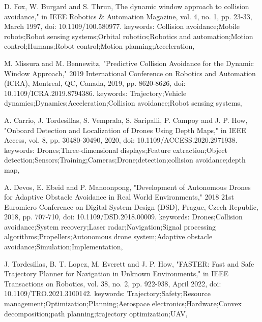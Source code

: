 \documentclass[12pt, a4paper, oneside]{article}
\begin{document}
	
	\begin{thebibliography}{1}
		
		D. Fox, W. Burgard and S. Thrun, The dynamic window approach to collision avoidance," in IEEE Robotics \& Automation Magazine, vol. 4, no. 1, pp. 23-33, March 1997, doi: 10.1109/100.580977. keywords: {Collision avoidance;Mobile robots;Robot sensing systems;Orbital robotics;Robotics and automation;Motion control;Humans;Robot control;Motion planning;Acceleration},
		
		M. Missura and M. Bennewitz, "Predictive Collision Avoidance for the Dynamic Window Approach," 2019 International Conference on Robotics and Automation (ICRA), Montreal, QC, Canada, 2019, pp. 8620-8626, doi: 10.1109/ICRA.2019.8794386.
		keywords: {Trajectory;Vehicle dynamics;Dynamics;Acceleration;Collision avoidance;Robot sensing systems},
		
		A. Carrio, J. Tordesillas, S. Vemprala, S. Saripalli, P. Campoy and J. P. How, "Onboard Detection and Localization of Drones Using Depth Maps," in IEEE Access, vol. 8, pp. 30480-30490, 2020, doi: 10.1109/ACCESS.2020.2971938.
		keywords: {Drones;Three-dimensional displays;Feature extraction;Object detection;Sensors;Training;Cameras;Drone;detection;collision avoidance;depth map},
		
		A. Devos, E. Ebeid and P. Manoonpong, "Development of Autonomous Drones for Adaptive Obstacle Avoidance in Real World Environments," 2018 21st Euromicro Conference on Digital System Design (DSD), Prague, Czech Republic, 2018, pp. 707-710, doi: 10.1109/DSD.2018.00009. keywords: {Drones;Collision avoidance;System recovery;Laser radar;Navigation;Signal processing algorithms;Propellers;Autonomous drone system;Adaptive obstacle avoidance;Simulation;Implementation},
		
		J. Tordesillas, B. T. Lopez, M. Everett and J. P. How, "FASTER: Fast and Safe Trajectory Planner for Navigation in Unknown Environments," in IEEE Transactions on Robotics, vol. 38, no. 2, pp. 922-938, April 2022, doi: 10.1109/TRO.2021.3100142.
		keywords: {Trajectory;Safety;Resource management;Optimization;Planning;Aerospace electronics;Hardware;Convex decomposition;path planning;trajectory optimization;UAV},
		
		
	\end{thebibliography}
	
\end{document}
